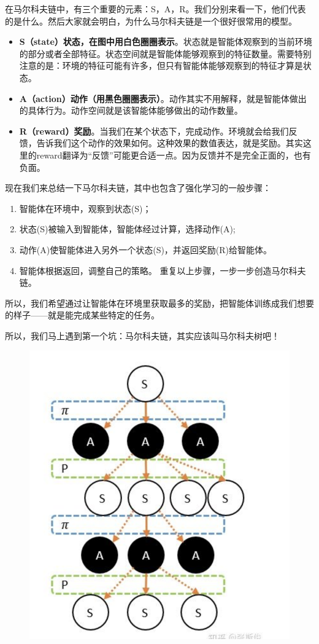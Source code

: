 \documentclass[12pt]{article}
\begin{document}
在马尔科夫链中，有三个重要的元素：S，A，R。我们分别来看一下，他们代表的是什么。然后大家就会明白，为什么马尔科夫链是一个很好很常用的模型。

\begin{itemize}
\setlength{\itemsep}{0pt}
\setlength{\parsep}{0pt}
\setlength{\parskip}{0pt}
    \item \textbf{S（state）状态，在图中用白色圈圈表示}。状态就是智能体观察到的当前环境的部分或者全部特征。状态空间就是智能体能够观察到的特征数量。需要特别注意的是：环境的特征可能有许多，但只有智能体能够观察到的特征才算是状态。
    \item \textbf{A（action）动作（用黑色圈圈表示）}。动作其实不用解释，就是智能体做出的具体行为。动作空间就是该智能体能够做出的动作数量。
    \item \textbf{R（reward）奖励}。当我们在某个状态下，完成动作。环境就会给我们反馈，告诉我们这个动作的效果如何。这种效果的数值表达，就是奖励。其实这里的reward翻译为“反馈”可能更合适一点。因为反馈并不是完全正面的，也有负面。
\end{itemize}

现在我们来总结一下马尔科夫链，其中也包含了强化学习的一般步骤：
\begin{enumerate}
\setlength{\itemsep}{0pt}
\setlength{\parsep}{0pt}
\setlength{\parskip}{0pt}
    \item 智能体在环境中，观察到状态(S)；
    \item 状态(S)被输入到智能体，智能体经过计算，选择动作(A);
    \item 动作(A)使智能体进入另外一个状态(S)，并返回奖励(R)给智能体。
    \item 智能体根据返回，调整自己的策略。 重复以上步骤，一步一步创造马尔科夫链。
\end{enumerate}

所以，我们希望通过让智能体在环境里获取最多的奖励，把智能体训练成我们想要的样子——就是能完成某些特定的任务。

所以，我们马上遇到第一个坑：马尔科夫链，其实应该叫马尔科夫树吧！
\begin{figure}[H]
    \centering
    \includegraphics[width=.5\textwidth]{fig/ReinforcementLearning/RL_Markov_Chain_Tree-Example.png}
\end{figure}
\end{document}
